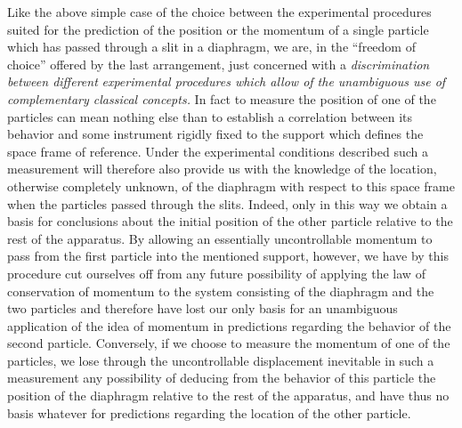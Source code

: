 \documentclass[11pt]{memoir}
\begin{document}
Like the above simple case of the choice between the experimental
procedures suited for the prediction of the position or the momentum of
a single particle which has passed through a slit in a diaphragm, we
are, in the ``freedom of choice'' offered by the last arrangement, just
concerned with a \emph{discrimination between different}
\emph{experimental procedures which allow of the unambiguous use of
complementary classical concepts.} In fact to measure the position of
one of the particles can mean nothing else than to establish a
correlation between its behavior and some instrument rigidly fixed to
the support which defines the space frame of reference. Under the
experimental conditions described such a measurement will therefore also
provide us with the knowledge of the location, otherwise completely
unknown, of the diaphragm with respect to this space frame when the
particles passed through the slits. Indeed, only in this way we obtain a
basis for conclusions about the initial position of the other particle
relative to the rest of the apparatus. By allowing an essentially
uncontrollable momentum to pass from the first particle into the
mentioned support, however, we have by this procedure cut ourselves off
from any future possibility of applying the law of conservation of
momentum to the system consisting of the diaphragm and the two particles
and therefore have lost our only basis for an unambiguous application of
the idea of momentum in predictions regarding the behavior of the second
particle. Conversely, if we choose to measure the momentum of one of the
particles, we lose through the uncontrollable displacement inevitable in
such a measurement any possibility of deducing from the behavior of this
particle the position of the diaphragm relative to the rest of the
apparatus, and have thus no basis whatever for predictions regarding the
location of the other particle.
\end{document}

